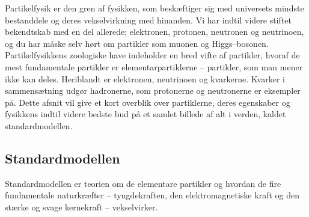 Partikelfysik er den gren af fysikken, som beskæftiger sig med
universets mindste bestanddele og deres vekselvirkning med hinanden.
Vi har indtil videre stiftet bekendtskab med en del allerede;
elektronen, protonen, neutronen og neutrinoen, og du har måske selv
hørt om partikler som muonen og Higgs--bosonen. Partikelfysikkens
zoologiske have indeholder en bred vifte af partikler, hvoraf de mest
fundamentale partikler er elementarpartiklerne -- partikler, som man
mener ikke kan deles. Heriblandt er elektronen, neutrinoen og
kvarkerne. Kvarker i sammensætning udgør hadronerne, som protonerne og
neutronerne er eksempler på. Dette afsnit vil give et kort overblik
over partiklerne, deres egenskaber og fysikkens indtil videre bedste
bud på et samlet billede af alt i verden, kaldet standardmodellen.

\subsection{Standardmodellen}
Standardmodellen er teorien om de elementare partikler og hvordan de
fire fundamentale naturkræfter -- tyngdekraften, den elektromagnetiske
kraft og den stærke og svage kernekraft -- vekselvirker.

